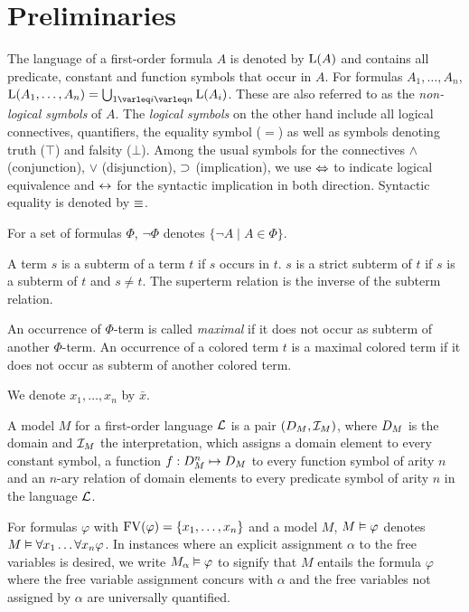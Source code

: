 \section{Preliminaries}


The language of a first-order formula $A$ is denoted by $\operatorname{L}(A)$ and contains all predicate, constant and function symbols that occur in $A$.
For formulas $A_1, \ldots, A_n$, $\Lang(A_1, \ldots, A_n) = \bigcup_{1\varleq i \varleq n} \Lang(A_i)$.
These are also referred to as the \emph{\mbox{non-logical} symbols} of $A$.
The \emph{logical symbols} on the other hand include all logical connectives, quantifiers, the equality symbol ($=$) as well as symbols denoting truth ($\top$) and falsity ($\bot$).
Among the usual symbols for the connectives $\land$ (conjunction), $\lor$ (disjunction), $\operatorname{\supset}$ (implication), we use $\operatorname{\Leftrightarrow}$ to indicate logical equivalence and $\operatorname{\leftrightarrow}$ for the syntactic implication in both direction.
Syntactic equality is denoted by $\equiv$.

For a set of formulas $\Phi$, $\lnot \Phi$ denotes $\{\lnot A \mid A \in \Phi\}$.


A term $s$ is a subterm of a term $t$ if $s$ occurs in $t$. $s$ is a strict subterm of $t$ if $s$ is a subterm of $t$ and $s \neq t$. The superterm relation is the inverse of the subterm relation.

An occurrence of $\Phi$-term is called \emph{maximal} if it does not occur as subterm of another $\Phi$-term.
An occurrence of a colored term $t$ is a maximal colored term if it does not occur as subterm of another colored term.

We denote $x_1, \ldots, x_n$ by $\bar x$.


A model $M$ for a first-order language $\operatorname{\mathcal{L}}$ is a pair $(D_{M}, \mathcal{I}_{M})$, where $D_{M}$ is the domain and $\mathcal{I}_{M}$ the interpretation, which assigns a domain element to every constant symbol, a function $f : D_{M}^n \mapsto D_{M}$ to every function symbol of arity $n$ and an $n$-ary relation of domain elements to every predicate symbol of arity $n$ in the language $\operatorname{\mathcal{L}}$.

For formulas $\varphi$ with $\operatorname{FV}(\varphi) = \{x_1, \dots, x_n\}$ and a model $M$, $M\vDash \varphi$ denotes $M \vDash \forall x_1 \dots \forall x_n \varphi$.
In instances where an explicit assignment $\alpha$ to the free variables is desired,
we write $M_\alpha \vDash \varphi$ 
to signify that $M$ entails the formula $\varphi$ where the free variable assignment concurs with $\alpha$ and the free variables not assigned by $\alpha$ are universally quantified.


